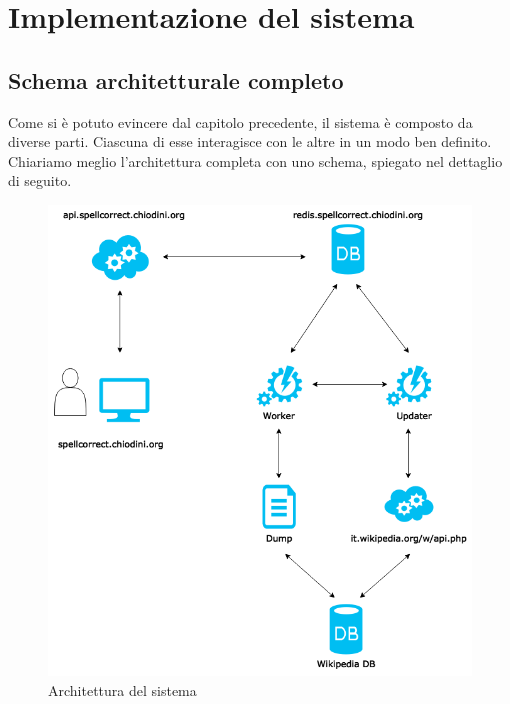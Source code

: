 \chapter{Implementazione del sistema}

\section{Schema architetturale completo}
Come si è potuto evincere dal capitolo precedente, il sistema è composto da diverse parti. Ciascuna di esse interagisce con le altre in un modo ben definito. Chiariamo meglio l'architettura completa con uno schema, spiegato nel dettaglio di seguito.
\begin{figure}[h]
\centering
\includegraphics[width=\textwidth]{Figures/architecture.png}
\caption{Architettura del sistema}
\end{figure}


